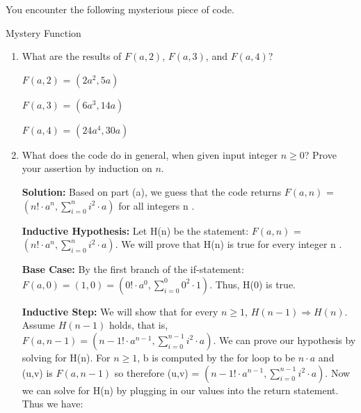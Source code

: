 \documentclass[11pt]{article}
\theoremstyle{definition}
\theoremstyle{theorem}
\begin{document}
\noindent You encounter the following mysterious piece of code.

\begin{algorithm}[H]
\caption{Mystery Function}
\end{algorithm}

\begin{enumerate}[label=(\alph*)]
\item What are the results of $F(a,2)$, $F(a,3)$, and $F(a,4)$?  

\begin{center}
    $F(a, 2)$ = $(2a^2, 5a)$
\end{center}
\begin{center}
    $F(a, 3)$ = $(6a^3, 14a)$
\end{center}
\begin{center}
    $F(a, 4)$ = $(24a^4, 30a)$
\end{center}

\item What does the code do in general, when given input integer $n
  \ge 0$? Prove your assertion by induction on $n$.
  
\begin{flushleft}
\textbf{Solution:} Based on part (a), we guess that the code returns $F(a, n)$ = $(n! \cdot a^n, \sum_{i=0}^{n} i^{2} \cdot a)$ for all integers n .
\end{flushleft}
\begin{flushleft}
\textbf{Inductive Hypothesis:} Let H(n) be the statement: $F(a, n)$ = $(n! \cdot a^n, \sum_{i=0}^{n} i^{2} \cdot a)$. We will prove that H(n) is true for every integer n .
\end{flushleft}
\begin{flushleft}
\textbf{Base Case:} By the first branch of the if-statement: $F(a,0)=(1,0)=(0! \cdot a^0, \sum_{i=0}^{0} 0^{2} \cdot 1)$. Thus, H(0) is true.
\end{flushleft}
\begin{flushleft}
\textbf{Inductive Step:} We will show that for every $n \geq 1$,
 $H(n-1) \Rightarrow H(n)$. Assume $H(n-1)$ holds, that is, $F(a,n-1) = (n-1! \cdot a^{n-1}, \sum_{i=0}^{n-1} i^{2} \cdot a)$. We can prove our hypothesis by solving for H(n). For $n \geq 1$, b is computed by the for loop to be $n \cdot a$ and (u,v) is $F(a,n-1)$ so therefore (u,v) = $(n-1! \cdot a^{n-1}, \sum_{i=0}^{n-1} i^{2} \cdot a)$. Now we can solve for H(n) by plugging in our values into the return statement. Thus we have: 
\end{flushleft}

\end{enumerate}
\end{document}

